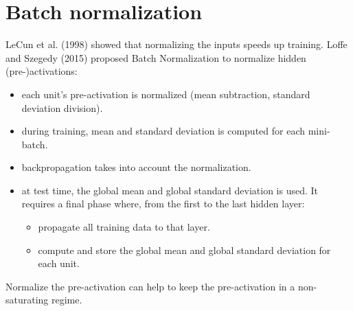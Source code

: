 \section{Batch normalization}
LeCun et al. (1998) showed that normalizing the inputs speeds
up training. Loffe and Szegedy (2015) proposed Batch Normalization to normalize hidden (pre-)activations:
\begin{itemize}
    \item each unit’s pre-activation is normalized (mean subtraction, standard deviation division).

    \item during training, mean and standard deviation is computed for each mini-batch.

    \item backpropagation takes into account the normalization.

    \item at test time, the global mean and global standard deviation is used. It requires a final phase where, from the first to the last hidden layer:
    \begin{itemize}
        \item propagate all training data to that layer.
        \item compute and store the global mean and global standard deviation for each unit.
    \end{itemize}

\end{itemize}
Normalize the pre-activation can help to keep the pre-activation in a non-saturating regime. 

